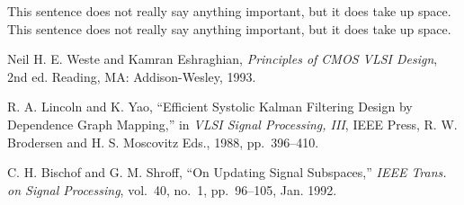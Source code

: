 \documentclass[final]{ieee}
\begin{document}
This sentence does not really say anything important, but it does take up space.
This sentence does not really say anything important, but it does take up space.





\begin{thebibliography}{99}

   Neil H. E. Weste and Kamran Eshraghian, {\it Principles
  of CMOS VLSI Design}, 2nd ed. Reading, MA: Addison-Wesley, 1993.

   R. A. Lincoln and K. Yao, ``Efficient Systolic Kalman
  Filtering Design by Dependence Graph Mapping,'' in {\it VLSI Signal
  Processing, III}, IEEE Press, R. W. Brodersen and H. S. Moscovitz Eds.,
  1988, pp.~396--410.

   C. H. Bischof and G. M. Shroff, ``On Updating Signal
  Subspaces,'' {\it IEEE Trans. on Signal Processing}, vol.~40, no.~1,
  pp.~96--105, Jan. 1992.

\end{thebibliography}
\end{document}
